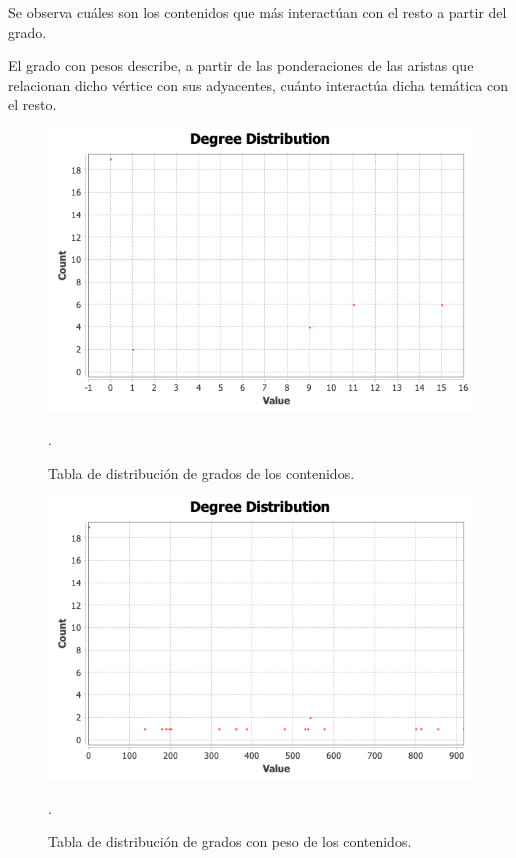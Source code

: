 \documentclass[a4paper,10pt,twocolumn]{article}
\begin{document}
        Se observa cuáles son los contenidos que más interactúan con el resto a partir del grado. 
        
        El grado con pesos describe, a partir de las ponderaciones de las aristas que relacionan dicho vértice con sus adyacentes, cuánto interactúa dicha temática con el resto.

        
        \begin{figure}[h!]
            \centering
            \includegraphics[scale=0.35]{degree-distribution.png}
            \caption{Tabla de distribución de grados de los contenidos. \label{fig:ex}}
.        \end{figure}

        \begin{figure}[h!]
            \centering
            \includegraphics[scale=0.35]{w-degree-distribution.png}
            \caption{Tabla de distribución de grados con peso de los contenidos. \label{fig:ex}}
.        \end{figure}
\end{document}
